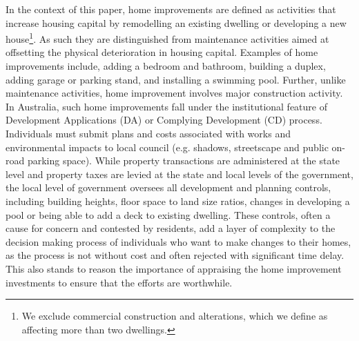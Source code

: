 \documentclass[AEJ,reqno, draftmode]{AEA} %
\begin{document}
In the context of this paper, home improvements are defined as activities that increase housing capital by remodelling an existing dwelling or developing a new house\footnote{We exclude commercial construction and alterations, which we define as affecting more than two dwellings.}. As such they are distinguished from maintenance activities aimed at offsetting the physical deterioration in housing capital. Examples of home improvements include, adding a bedroom and bathroom, building a duplex, adding garage or parking stand, and installing a swimming pool. Further, unlike maintenance activities, home improvement involves major construction activity. In Australia, such home improvements fall under the institutional feature of Development Applications (DA) or Complying Development (CD) process. Individuals must submit plans and costs associated with works and environmental impacts to local council (e.g. shadows, streetscape and public on-road parking space). While property transactions are administered at the state level and property taxes are levied at the state and local levels of the government, the local level of government oversees all development and planning controls, including building heights, floor space to land size ratios, changes in developing a pool or being able to add a deck to existing dwelling. These controls, often a cause for concern and contested by residents, add a layer of complexity to the decision making process of individuals who want to make changes to their homes, as the process is not without cost and often rejected with significant time delay. This also stands to reason the importance of appraising the home improvement investments to ensure that the efforts are worthwhile.
\end{document}
